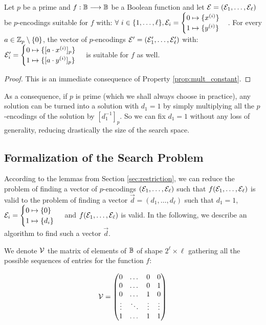 \begin{lemma}
    Let $p$ be a prime and $f:\mathbb{B} \longrightarrow \mathbb{B}$ be a Boolean function and let $\mathcal{E} = (\mathcal{E}_1, \dots, \mathcal{E}_\ell)$ be $p$-encodings suitable for $f$ with: $\forall~i \in \{1, \dots, \ell\}, \mathcal{E}_i = \begin{cases} 0 \mapsto \{x^{(i)}\} \\ 1 \mapsto \{y^{(i)}\} \end{cases}$. For every $a \in \mathbb{Z}_p \setminus \{0\}$, the vector of $p$-encodings $\mathcal{E} '= (\mathcal{E}'_1, \dots, \mathcal{E}'_\ell)$ with: $\mathcal{E}'_i = \begin{cases} 0 \mapsto \{[a \cdot x^{(i)}]_p\} \\ 1 \mapsto \{[a \cdot y^{(i)}]_p\} \end{cases}$
    is suitable for $f$ as well.
    \label{lemma:multiplication_in_prime_group}
\end{lemma}

\begin{proof}
This is an immediate consequence of Property \ref{prop:mult_constant}.
\end{proof}

As a consequence, if $p$ is prime (which we shall always choose in practice), any solution can be turned into a solution with $d_1 = 1$ by simply multiplying all the $p$-encodings of the solution by $[d_1^{-1}]_p$. So we can fix $d_1 = 1$ without any loss of generality, reducing drastically the size of the search space. 





\subsection{Formalization of the Search Problem}

According to the lemmas from Section \ref{sec:restriction}, we can reduce the problem of finding a vector of $p$-encodings $(\mathcal{E}_1, \dots, \mathcal{E}_\ell)$ such that $f(\mathcal{E}_1, \dots, \mathcal{E}_\ell)$ is valid to the problem of finding a vector $\vec{d} = (d_1, \dots, d_\ell)$ such that $d_1 = 1$, $\mathcal{E}_i = \begin{cases} 0 \mapsto \{0\} \\ 1 \mapsto \{d_i\} \end{cases}$ and $f(\mathcal{E}_1, \dots, \mathcal{E}_\ell)$ is valid. In the following, we describe an algorithm to find such a vector $\vec d$.


We denote $\mathcal V$ the matrix of elements of $\mathbb{B}$ of shape $2^\ell \times \ell$ gathering all the possible sequences of entries for the function $f$:

$$\mathcal V = \left ( \begin{matrix}
0 & \dots & 0 & 0\\
0 & \dots & 0 & 1\\
0 & \dots & 1 & 0\\
\vdots & \ddots & \vdots & \vdots\\
1 & \dots & 1 & 1
\end{matrix}
\right ) $$

